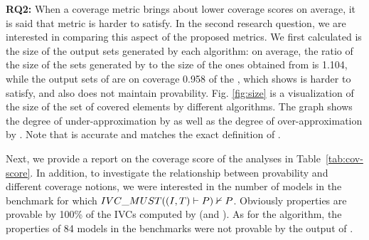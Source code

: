 \textbf{RQ2:} When a coverage metric brings about lower coverage scores on average,
it is said that metric is harder to satisfy. In the second research question,
we are interested in comparing this aspect of the proposed metrics. 
We first calculated is the size of the output sets generated by each algorithm: on average, the ratio of the size of the sets generated by \ucalg to the size of the ones obtained from \ucbfalg is 1.104, while the output sets of \mustalg are on coverage 0.958 of the \ucbfalg, which shows \mustalg is harder to satisfy, and also does not maintain provability. Fig. \ref{fig:size} is a visualization of the size of the set of covered elements by different algorithms. The graph shows the degree of under-approximation by \mustalg as well as the degree of over-approximation by \ucalg.
Note that \ucbfalg is accurate and matches the exact definition of \ivccov . 

Next, we provide a report on the coverage score of the analyses in Table~\ref{tab:cov-score}. In addition, to investigate
the relationship between provability and different coverage notions,
we were interested in the number of models in the benchmark for which $\mustalg ((I, T) \vdash P) \nvdash P$.
Obviously properties are provable by 100\% of the IVCs computed by \ucalg (and \ucbfalg).
As for the \mustalg algorithm, the properties of 84 models in the benchmarks were not provable by the output of \mustalg.


